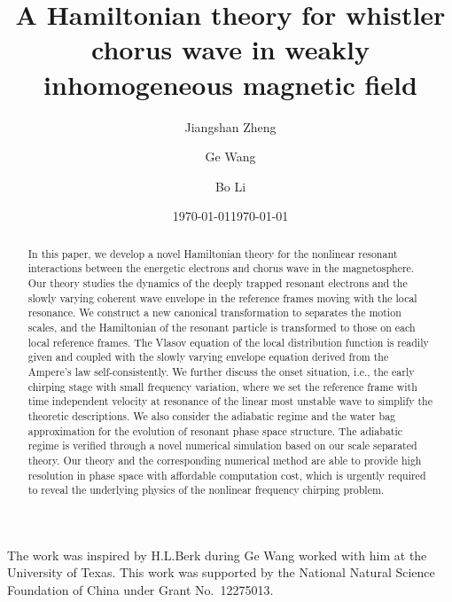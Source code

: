 \documentclass[showkeys,reprint,unsortedaddress]{revtex4-2}
\begin{document}
\title{A Hamiltonian theory for whistler chorus wave in weakly inhomogeneous magnetic field}
\author{Jiangshan Zheng}
\author{Ge Wang}
\author{Bo Li}
\date{\today}
\date{\today}
\begin{abstract}
In this paper, we develop a novel Hamiltonian theory for the nonlinear resonant interactions between the energetic electrons and chorus wave in the magnetosphere.
Our theory studies the dynamics of the deeply trapped resonant electrons and the slowly varying coherent wave envelope in the reference frames moving with the local resonance.
We construct a new canonical transformation to separates the motion scales, and the Hamiltonian of the resonant particle is transformed to those on each local reference frames.
The Vlasov equation of the local distribution function is readily given and coupled with the slowly varying envelope equation derived from the Ampere's law self-consistently.
We further discuss the onset situation, i.e., the early chirping stage with small frequency variation, where we set the reference frame with time independent velocity at resonance of the linear most unstable wave to simplify the theoretic descriptions. 
We also consider the adiabatic regime and the water bag approximation for the evolution of resonant phase space structure.
The adiabatic regime is verified through a novel numerical simulation based on our scale separated theory.
Our theory and the corresponding numerical method are able to provide high resolution in phase space with affordable computation cost, which is urgently required to reveal the underlying physics of the nonlinear frequency chirping problem.
\end{abstract}
\maketitle









\begin{acknowledgments}
    The work was inspired by H.L.Berk during Ge Wang worked with him at the University of Texas.
    This work was supported by the National Natural Science Foundation of China under Grant No.~12275013.
\end{acknowledgments}

%

\end{document}
